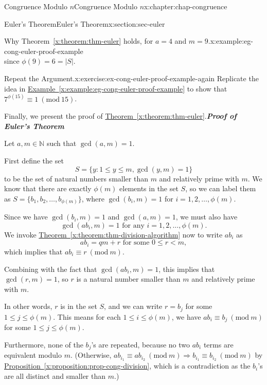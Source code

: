 \documentclass[oneside,10pt,]{book}
\newcommand{\xreffont}{\relax}
\newcommand{\alert}[1]{\textbf{\textit{#1}}}
\numberwithin{equation}{section}
\newcommand{\Mod}[1]{\ \left(\mathrm{mod}\ #1\right)}
\newcommand{\lt}{<}
\begin{document}
\begin{chapterptx}{Congruence Modulo \(n\)}{}{Congruence Modulo \(n\)}{}{}{x:chapter:chap-congruence}
\begin{sectionptx}{Euler's Theorem}{}{Euler's Theorem}{}{}{x:section:sec-euler}
\begin{example}{Why Theorem~{\xreffont\ref*{x:theorem:thm-euler}} holds, for \(a = 4\) and \(m = 9\).}{x:example:eg-cong-euler-proof-example}
\begin{equation*}
\end{equation*}
since \(\phi(9) = 6 = |S|\).%
\end{example}
\begin{inlineexercise}{Repeat the Argument.}{x:exercise:ex-cong-euler-proof-example-again}%
Replicate the idea in \hyperref[x:example:eg-cong-euler-proof-example]{Example~{\xreffont\ref{x:example:eg-cong-euler-proof-example}}} to show that \(7^{\phi(15)} \equiv 1 \Mod{15}\).%
\end{inlineexercise}
Finally, we present the proof of \hyperref[x:theorem:thm-euler]{Theorem~{\xreffont\ref{x:theorem:thm-euler}}}.\alert{Proof of Euler's Theorem}%
\par
Let \(a,m \in \mathbb{N}\) such that \(\gcd(a,m) = 1\).%
\par
First define the set%
\begin{equation*}
S = \{y : 1 \leq y \leq m, \gcd(y,m) = 1\}
\end{equation*}
to be the set of natural numbers smaller than \(m\) and relatively prime with \(m\). We know that there are exactly \(\phi(m)\) elements in the set \(S\), so we can label them as \(S = \{b_1,b_2,\ldots,b_{\phi(m)}\}\), where \(\gcd(b_i,m) = 1\) for \(i = 1,2,\ldots,\phi(m)\).%
\par
Since we have \(\gcd(b_i,m) = 1\) and \(\gcd(a,m) = 1\), we must also have%
\begin{equation*}
\gcd(ab_i, m) = 1 \text{ for any } i = 1,2,\ldots,\phi(m)\text{.}
\end{equation*}
We invoke \hyperref[x:theorem:thm-division-algorithm]{Theorem~{\xreffont\ref{x:theorem:thm-division-algorithm}}} now to write \(ab_i\) as%
\begin{equation*}
ab_i = qm + r \text{ for some } 0 \leq r \lt m,
\end{equation*}
which implies that \(ab_i \equiv r \Mod{m}\).%
\par
Combining with the fact that \(\gcd(ab_i,m) = 1\), this implies that \(\gcd(r,m) = 1\), so \(r\) is a natural number smaller than \(m\) and relatively prime with \(m\).%
\par
In other words, \(r\) is in the set \(S\), and we can write \(r = b_j\) for some \(1 \leq j \leq \phi(m)\). This means for each \(1 \leq i \leq \phi(m)\), we have \(ab_i \equiv b_j \Mod{m}\) for some \(1 \leq j \leq \phi(m)\).%
\par
Furthermore, none of the \(b_j\)'s are repeated, because no two \(ab_i\) terms are equivalent modulo \(m\). (Otherwise, \(ab_{i_1} \equiv ab_{i_2} \Mod{m} \Rightarrow b_{i_1} \equiv b_{i_2} \Mod{m}\) by \hyperref[x:proposition:prop-cong-division]{Proposition~{\xreffont\ref{x:proposition:prop-cong-division}}}, which is a contradiction as the \(b_i\)'s are all distinct and smaller than \(m\).)%

\end{sectionptx}
\end{chapterptx}
\end{document}
